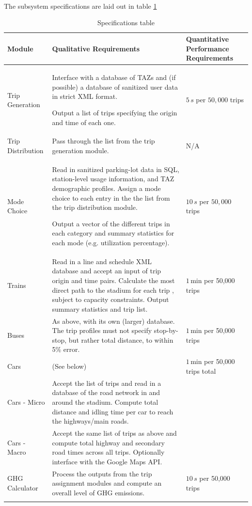 \documentclass[draft,12pt,titlepage]{article}
\begin{document}
The subsystem specifications are laid out in table \ref{specs}
\begin{table}[htp]
  \centering
  \caption{Specifications table}
  \label{specs}
  \begin{tabular}{%
    >{\raggedright}p{}%
    p{}%
    >{\raggedright\arraybackslash}p{}}
    \firsthline
    \bfseries Module & \bfseries Qualitative Requirements & \bfseries Quantitative Performance Requirements \\ \hline
    Trip Generation & Interface with a database of TAZs and (if
possible) a database of sanitized user data in strict XML format. 

Output a list of trips specifying the origin and time of each one. &
    $5\,s$ per $50,000$ trips \\
    Trip Distribution & Pass through the list from the trip generation
module. & N/A \\
    Mode Choice & Read in sanitized parking-lot data in SQL, station-level usage information, and TAZ demographic profiles. Assign a mode choice to each entry in the the list from the trip distribution module. 
 
Output a vector of the different trips in each category and 
summary statistics for each mode (e.g. utilization percentage). &
    $10\, s$ per $50,000$ trips \\ 
    Trains & Read in a line and schedule XML database
and accept an input of trip origin and time pairs. Calculate the most direct path to the stadium for each trip , subject to capacity
constraints. Output summary statistics and trip list. & $1\,$min per 50,000 trips \\
    Buses & As above, with its own (larger) database. The trip profiles must not specify stop-by-stop, but rather total distance, to within 5\% error. & $1\,$min per 50,000 trips \\
    Cars & (See below) & $1\,$min per 50,000 trips total \\
    Cars - Micro & Accept the list of trips and read in a
database of the road network in and around the stadium. Compute total distance and idling time per car to reach the highways/main roads. & \\
    Cars - Macro & Accept the same list of trips as above and compute total highway and secondary road times across all trips. Optionally interface with the Google Maps API. & \\
    GHG Calculator & Process the outputs from the trip assignment modules and compute an overall level of GHG emissions. & $10\,s$ per 50,000 trips \\
    \lasthline
  \end{tabular}
\end{table}
\end{document}
